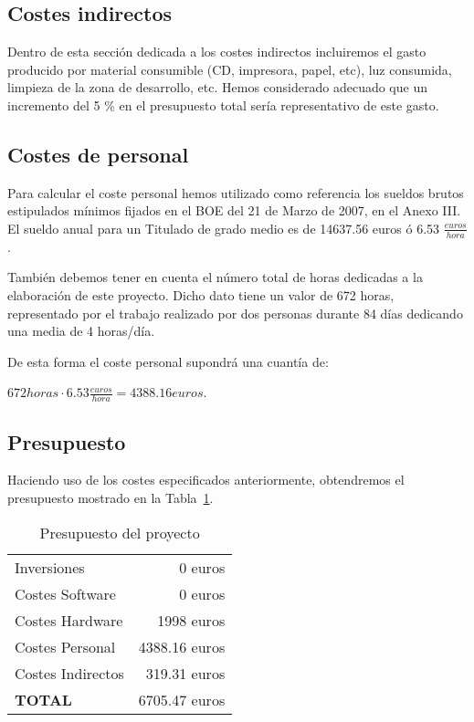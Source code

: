 	
	\subsection{Costes indirectos}
	Dentro de esta secci\'on dedicada a los costes indirectos incluiremos el gasto producido por material consumible 
	(CD, impresora, papel, etc), luz consumida, limpieza de la zona de desarrollo, etc. Hemos considerado adecuado 
	 que un incremento del 5 \% en el presupuesto total ser\'ia representativo de este gasto.

	
	\subsection{Costes de personal}
	
	Para calcular el coste personal hemos utilizado como referencia los sueldos brutos estipulados m\'inimos 
	fijados en el BOE del 21 de Marzo de 2007, en el Anexo III. El sueldo anual para un Titulado de grado medio 
	es de 14637.56 euros \'o 6.53 $\frac{euros}{hora}$. 
	
	Tambi\'en debemos tener en cuenta el n\'umero total de horas dedicadas a la elaboraci\'on de este proyecto. Dicho 
	dato tiene un valor de 672 horas, representado por el trabajo realizado por dos personas durante 84 d\'ias dedicando 
	una media de 4 horas/d\'ia.
	
	De esta forma el coste personal supondr\'a una cuant\'ia de:
	
\begin{center}
$672 horas \cdot 6.53 \frac{euros}{hora} = 4388.16 euros$.
\end{center}
	
	
	\subsection{Presupuesto}
	
	Haciendo uso de los costes especificados anteriormente, obtendremos el presupuesto mostrado en la 
	Tabla~\ref{tab:presup}.

\begin{table}
	\centering
		\begin{tabular}{|p{7cm}|r|}
		\hline
		Inversiones & 0 euros \\
		Costes Software & 0 euros \\
		Costes Hardware & 1998 euros \\
		Costes Personal & 4388.16 euros \\
		Costes Indirectos & 319.31 euros \\ \hline  
		\textbf{TOTAL} & 6705.47 euros \\	
		\hline	
		\end{tabular}
	\caption{Presupuesto del proyecto}
	\label{tab:presup}
\end{table}

		
	
	
